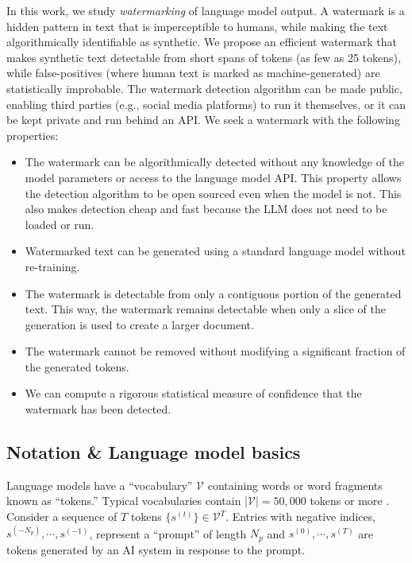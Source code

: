 \documentclass{article}
\theoremstyle{plain}
\theoremstyle{definition}
\theoremstyle{remark}
\newcommand{\vocab}{\mathcal{V}}
\begin{document}
\begin{mdframed}[backgroundcolor=teaserblue,hidealllines=true]
In this work, we study \emph{watermarking} of language model output. A watermark is a hidden pattern in text that is imperceptible to humans, while making the text algorithmically identifiable as synthetic. We propose an efficient watermark that makes synthetic text  detectable from short spans of tokens (as few as 25 tokens),  while false-positives (where human text is marked as machine-generated)  are statistically improbable.  The watermark detection algorithm can be made public,   enabling third 
parties (e.g., social media  platforms) to run it themselves, or it can be kept private and run behind an API. We seek
a watermark with the following properties:
\end{mdframed}

\begin{itemize}
\item The watermark can be algorithmically detected without any knowledge of the model parameters or access to the language model API.  This property allows the detection algorithm to be open sourced even when the model is not.  This also makes detection cheap and fast because the LLM does not need to be loaded or run.
\item Watermarked text can be generated using a standard language model without re-training. 
\item The watermark is detectable from only a contiguous portion of the generated text. This way, the watermark remains detectable when only a slice of the generation is used to create a larger document.%
\item The watermark cannot be removed without modifying a significant fraction of the generated tokens.
\item We can compute a rigorous statistical measure of confidence that the watermark has been detected.
\end{itemize}


\subsection{Notation \& Language model basics}

Language models have a ``vocabulary'' $\vocab$ containing words or word fragments known as ``tokens.'' Typical vocabularies contain $|\vocab| = 50,000$ tokens or more \citep{radford_language_2019,liu_roberta_2019}. 
Consider a sequence of $T$ tokens $\{s^{(t)}\}\in \vocab^T$. Entries with negative indices, $s^{(-N_p)},\cdots, s^{(-1)}$, represent a ``prompt'' of length $N_p$ and $s^{(0)},\cdots,s^{(T)}$ are tokens generated by an AI system in response to the prompt.
\end{document}
